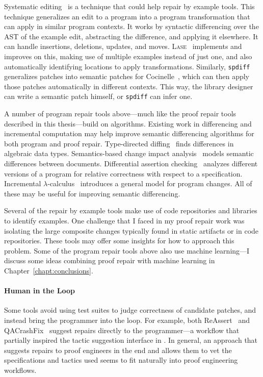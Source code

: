 Systematic editing~\cite{meng2011systematic} is a technique that could help repair by example tools.
This technique generalizes an edit to a program into a program transformation that can apply in similar program contexts.
It works by syntactic differencing over the AST of the example edit, abstracting the difference, and applying it elsewhere.
It can handle insertions, deletions, updates, and moves.
\textsc{Lase}~\cite{meng2013lase} implements and improves on this,
making use of multiple examples instead of just one, %
and also automatically identifying locations to apply transformations.
Similarly, \lstinline{spdiff}~\cite{andersen2010generic} generalizes patches into semantic patches for Cocinelle~\cite{padioleau2008documenting},
which can then apply those patches automatically in different contexts. This way, the library designer can write a semantic patch
himself, or \lstinline{spdiff} can infer one.

A number of program repair tools above---much like the proof repair tools described in this thesis---build on  algorithms.
Existing work in differencing and incremental computation may help 
improve semantic differencing algorithms for both program and proof repair.
Type-directed diffing~\cite{Miraldo:2017:TDS:3122975.3122976}
finds differences in algebraic data types.
Semantics-based change impact analysis~\cite{Autexier:2010:SCI:1860559.1860580} models semantic differences
between documents.
Differential assertion checking~\cite{differential-assertion-checking-2} analyzes different
versions of a program for relative correctness with respect to a specification.
Incremental $\lambda$-calculus~\cite{Cai:2014:TCH:2594291.2594304} introduces a general model for program changes.
All of these may be useful for improving semantic differencing.

Several of the repair by example tools make use of code repositories and libraries to identify examples.
One challenge that I faced in my proof repair work was isolating the large composite changes typically found in static artifacts or in code repositories.
These tools may offer some insights for how to approach this problem.
Some of the program repair tools above also use machine learning---I discuss some ideas combining proof repair
with machine learning in Chapter~\ref{chapt:conclusions}.

\paragraph{Human in the Loop}
Some tools avoid using test suites to judge correctness of candidate patches, and instead
bring the programmer into the loop. For example, both ReAssert~\cite{daniel2009reassert}
and QACrashFix~\cite{gao2015fixing} suggest repairs directly to the programmer---a workflow
that partially inspired the tactic suggestion interface in \toolnamec.
In general, an approach that suggests repairs to proof engineers in the end
and allows them to vet the specifications and tactics used seems to fit naturally into proof engineering workflows. 

